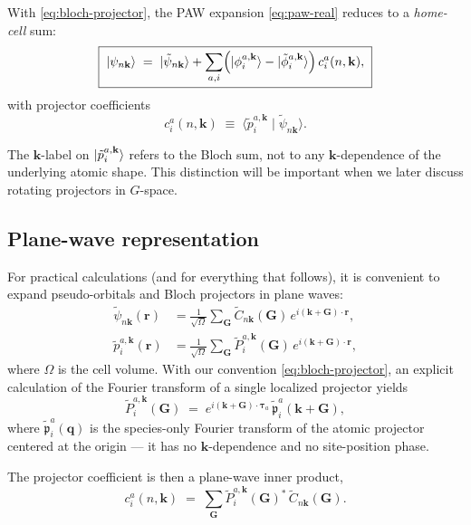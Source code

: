 \documentclass[11pt,a4paper]{article}
\newcommand{\rr}{\mathbf{r}}
\newcommand{\kk}{\mathbf{k}}
\newcommand{\GG}{\mathbf{G}}
\newcommand{\tautau}{\boldsymbol{\tau}}
\begin{document}
With \eqref{eq:bloch-projector}, the PAW expansion \eqref{eq:paw-real} reduces
to a \emph{home-cell} sum:
\begin{equation}
\boxed{\;\ket{\psi_{n\kk}}
   \;=\; \ket{\tilde\psi_{n\kk}}
   + \sum_{a,i}\Bigl(\ket{\phi_i^{a,\kk}} - \ket{\tilde\phi_i^{a,\kk}}\Bigr)\,
                 c_i^{a}(n,\kk),\;}
\label{eq:paw-bloch}
\end{equation}
with projector coefficients
\begin{equation}
c_i^a(n,\kk) \;\equiv\; \langle \tilde p_i^{a,\kk} \mid \tilde\psi_{n\kk}\rangle.
\label{eq:projector-coef}
\end{equation}

The $\kk$-label on $\ket{\tilde p_i^{a,\kk}}$ refers to the Bloch sum, not to
any $\kk$-dependence of the underlying atomic shape. This distinction will be
important when we later discuss rotating projectors in $G$-space.

\subsection{Plane-wave representation}

For practical calculations (and for everything that follows), it is
convenient to expand pseudo-orbitals and Bloch projectors in plane waves:
\begin{align}
\tilde\psi_{n\kk}(\rr)
  &= \frac{1}{\sqrt{\Omega}} \sum_{\GG}
      \tilde C_{n\kk}(\GG)\, e^{i(\kk + \GG)\cdot\rr}, \\
\tilde p_i^{a,\kk}(\rr)
  &= \frac{1}{\sqrt{\Omega}} \sum_{\GG}
      \tilde P_i^{a,\kk}(\GG)\, e^{i(\kk + \GG)\cdot\rr},
\end{align}
where $\Omega$ is the cell volume. With our convention
\eqref{eq:bloch-projector}, an explicit calculation of the Fourier transform of
a single localized projector yields
\begin{equation}
\tilde P_i^{a,\kk}(\GG)
  \;=\; e^{i(\kk + \GG)\cdot\tautau_a}\,
        \tilde{\mathfrak p}_i^{a}(\kk + \GG),
\label{eq:projector-pw}
\end{equation}
where $\tilde{\mathfrak p}_i^{a}(\mathbf{q})$ is the species-only Fourier
transform of the atomic projector centered at the origin --- it has no
$\kk$-dependence and no site-position phase.

The projector coefficient is then a plane-wave inner product,
\begin{equation}
c_i^a(n,\kk)
  \;=\; \sum_{\GG} \tilde P_i^{a,\kk}(\GG)^*\,\tilde C_{n\kk}(\GG).
\label{eq:projector-pw-inner}
\end{equation}
\end{document}
